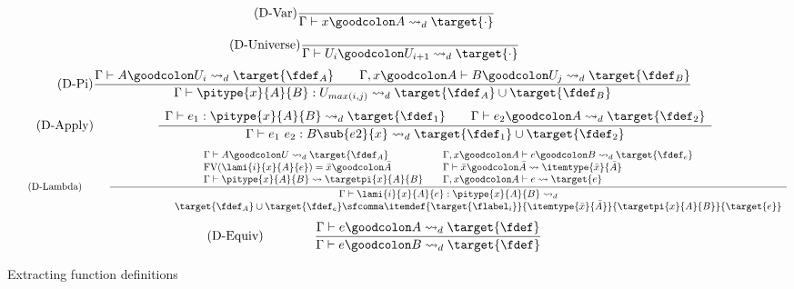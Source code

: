 \begin{figure}
	\begin{equation}
		\tag{D-Var}
		\frac
			{}
			{\Gamma \vdash x \goodcolon A \leadsto_d \target{\cdot}}
	\end{equation} \vspace{0.5cm}
	\begin{equation}
		\tag{D-Universe}
		\frac
			{}
			{\Gamma \vdash U_i \goodcolon U_{i+1} \leadsto_d \target{\cdot}}
	\end{equation} \vspace{0.5cm}
	\begin{equation}
		\tag{D-Pi}
		\frac
			{\Gamma \vdash A \goodcolon U_i \leadsto_d \target{\fdef_A} \qquad \Gamma, x \goodcolon A \vdash B \goodcolon U_j \leadsto_d \target{\fdef_B}
			}
			{\Gamma \vdash \pitype{x}{A}{B} \mathrel{:} U_{max(i, j)} \leadsto_d \target{\fdef_A} \cup \target{\fdef_B}}
	\end{equation} \vspace{0.5cm}
	\begin{equation}
		\tag{D-Apply}
		\qquad\qquad\quad
		\frac{{\begin{array}{c c}
			  {\Gamma \vdash e_1 \mathrel{:} \pitype{x}{A}{B} \leadsto_d \target{\fdef_1} \qquad \Gamma \vdash e_2 \goodcolon A \leadsto_d \target{\fdef_2}} \\
        	\end{array}}}
			{\Gamma \vdash e_1 \ e_2 \mathrel{:} B\sub{e2}{x} \leadsto_d \target{\fdef_1} \cup \target{\fdef_2}}
	\end{equation} \vspace{0.5cm}
	\begin{equation}
		\tag{D-Lambda}
		\qquad\ \ 
		\frac{{\begin{array}{l @{\qquad} l}
			  \Gamma \vdash A \goodcolon U \leadsto_d \target{\fdef_A} & \Gamma, x \goodcolon A \vdash e \goodcolon B \leadsto_d \target{\fdef_e} \\
			   \text{FV}(\lami{i}{x}{A}{e}) = \bar{x} \goodcolon \bar{A} &
			   \Gamma \vdash \bar{x} \goodcolon \bar{A} \leadsto \itemtype{\bar{x}}{\bar{A}} \\
			   \Gamma \vdash \pitype{x}{A}{B} \leadsto \targetpi{x}{A}{B} &
			   \Gamma, x \goodcolon A \vdash e \leadsto \target{e}\\
        	\end{array}}}
			{\begin{array}{c}
			 \Gamma \vdash \lami{i}{x}{A}{e} \mathrel{:} \pitype{x}{A}{B} \leadsto_d \\
			  \qquad \qquad \qquad \target{\fdef_A} \cup \target{\fdef_e} \sfcomma \itemdef{\target{\flabel_i}}{\itemtype{\bar{x}}{\bar{A}}}{\targetpi{x}{A}{B}}{\target{e}}
			 \end{array}
			}
	\end{equation} \vspace{0.5cm}
	\begin{equation}
		\tag{D-Equiv}
		\qquad\qquad
		\frac
			{\Gamma \vdash e \goodcolon A \leadsto_d \target{\fdef}}
			{\Gamma \vdash e \goodcolon B \leadsto_d \target{\fdef}}
	\end{equation}
	\caption{Extracting function definitions}
    \label{fig:dcc def}
\end{figure}

